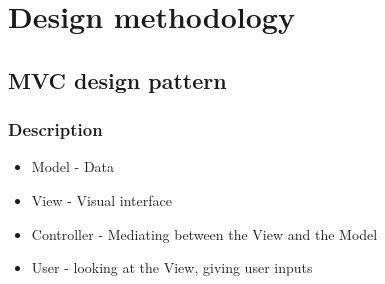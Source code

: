 \chapter{Design methodology}
\section{MVC design pattern}
\subsection{Description}
\begin{itemize}
\item Model - Data
\item View - Visual interface
\item Controller - Mediating between the View and the Model
\item User - looking at the View, giving user inputs
\end{itemize}

      
    
    
  
  
  